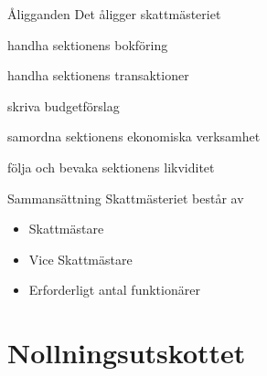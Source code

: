\documentclass[pdfbookmarks,a4paper,11pt]{article}
\newlength{\itemcollength}
\newenvironment{reglemlista}{%
  \begin{list}{}{%
      \setlength{\labelwidth}{\itemcollength}%
      \setlength{\leftmargin}{\labelwidth + \labelsep}%
      \renewcommand{\makelabel}[1]{%
        \raisebox{0pt}[1ex][0pt]{%
          \makebox[\labelwidth][l]{%
            \parbox[t]{\itemcollength}{%
              \raggedright\hspace{0pt}##1}}}\hfill}%
      }}{%
  \end{list}}
\begin{document}
\begin{reglemlista}

	\item[Åligganden]
	Det åligger skattmästeriet
	\begin{attlista}
		\item handha sektionens bokföring
		\item handha sektionens transaktioner
		\item skriva budgetförslag
		\item samordna sektionens ekonomiska verksamhet
		\item följa och bevaka sektionens likviditet
	\end{attlista}

	\item[Sammansättning]
	Skattmästeriet består av
	\begin{itemize}
		\item Skattmästare
		\item Vice Skattmästare
		\item Erforderligt antal funktionärer
	\end{itemize}
\end{reglemlista}

\section{Nollningsutskottet}
\end{document}
